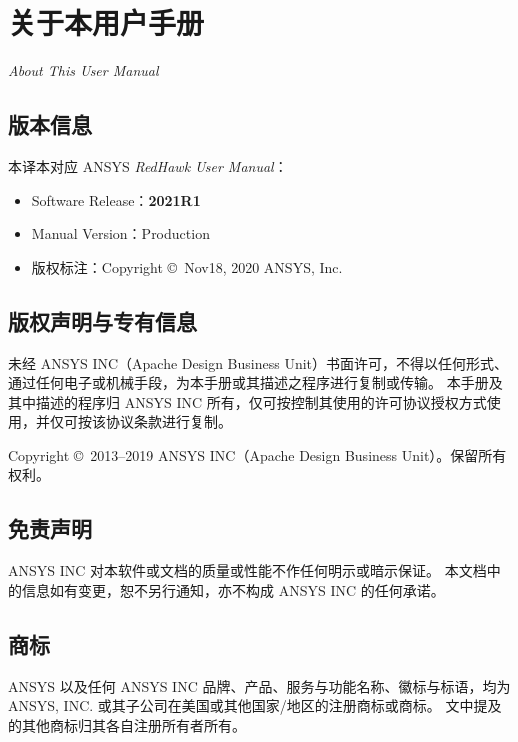 \chapter*{关于本用户手册}

\noindent\textit{About This User Manual}

\section*{版本信息}

本译本对应 ANSYS \textit{RedHawk User Manual}：
\begin{itemize}
  \item Software Release：\textbf{2021R1}
  \item Manual Version：Production
  \item 版权标注：Copyright \copyright\ Nov18, 2020 ANSYS, Inc.
\end{itemize}

\section*{版权声明与专有信息}

未经 ANSYS INC（Apache Design Business Unit）书面许可，不得以任何形式、通过任何电子或机械手段，为本手册或其描述之程序进行复制或传输。
本手册及其中描述的程序归 ANSYS INC 所有，仅可按控制其使用的许可协议授权方式使用，并仅可按该协议条款进行复制。

Copyright \copyright\ 2013--2019 ANSYS INC（Apache Design Business Unit）。保留所有权利。

\section*{免责声明}

ANSYS INC 对本软件或文档的质量或性能不作任何明示或暗示保证。
本文档中的信息如有变更，恕不另行通知，亦不构成 ANSYS INC 的任何承诺。

\section*{商标}

ANSYS 以及任何 ANSYS INC 品牌、产品、服务与功能名称、徽标与标语，均为 ANSYS, INC. 或其子公司在美国或其他国家/地区的注册商标或商标。
文中提及的其他商标归其各自注册所有者所有。

